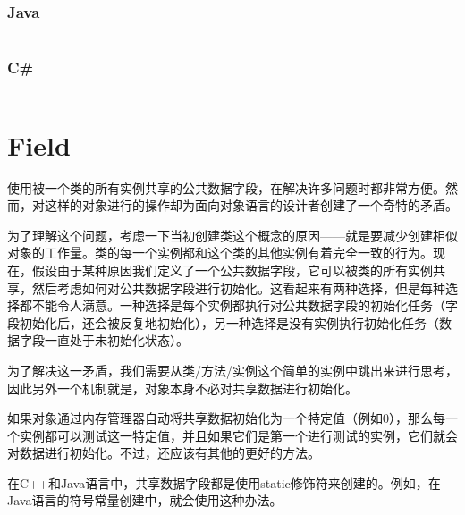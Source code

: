 \begin{lstlisting}[language=C++]

\end{lstlisting}




\subsection{Java}


\begin{lstlisting}[language=C++]

\end{lstlisting}



\subsection{C\#}



\begin{lstlisting}[language=C++]

\end{lstlisting}


\chapter{Field}

使用被一个类的所有实例共享的公共数据字段，在解决许多问题时都非常方便。然而，对这样的对象进行的操作却为面向对象语言的设计者创建了一个奇特的矛盾。

为了理解这个问题，考虑一下当初创建类这个概念的原因——就是要减少创建相似对象的工作量。类的每一个实例都和这个类的其他实例有着完全一致的行为。现在，假设由于某种原因我们定义了一个公共数据字段，它可以被类的所有实例共享，然后考虑如何对公共数据字段进行初始化。这看起来有两种选择，但是每种选择都不能令人满意。一种选择是每个实例都执行对公共数据字段的初始化任务（字段初始化后，还会被反复地初始化），另一种选择是没有实例执行初始化任务（数据字段一直处于未初始化状态）。

为了解决这一矛盾，我们需要从类/方法/实例这个简单的实例中跳出来进行思考，因此另外一个机制就是，对象本身不必对共享数据进行初始化。

如果对象通过内存管理器自动将共享数据初始化为一个特定值（例如0），那么每一个实例都可以测试这一特定值，并且如果它们是第一个进行测试的实例，它们就会对数据进行初始化。不过，还应该有其他的更好的方法。

在C++和Java语言中，共享数据字段都是使用static修饰符来创建的。例如，在Java语言的符号常量创建中，就会使用这种办法。

